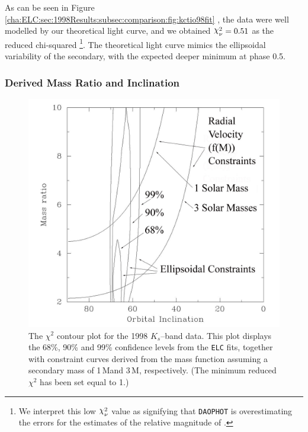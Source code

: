 As can be seen in Figure~%
\vref{cha:ELC:sec:1998Results:subsec:comparison:fig:kctio98fit}%
, the data were well modelled by our theoretical light curve, and we
obtained $\Chi_{\nu}^{2} = 0.51$ as the reduced chi-squared%
\footnote{%
\label{cha:ELC:sec:1998Results:foot:LowError}
We interpret this low $\Chi_{\nu}^{2}$ value as signifying that
\texttt{DAOPHOT} is overestimating the errors for the estimates of the
relative magnitude of \groj. }. %
The theoretical light curve mimics the ellipsoidal variability of the
secondary, with the expected deeper minimum at phase 0.5. %


\subsubsection{Derived Mass Ratio and Inclination}
\label{cha:ELC:sec:1998Results:subsec:comparison:subsubsec:derivedQ}

\begin{figure}[!htb]
\begin{center}
\includegraphics[width=5.0in]{contourPlot2}
\caption{%
The $\chi^2$ contour plot for the 1998 $K_{s}$--band data. This plot displays the 68\%, 90\% and
 99\% confidence levels from the \texttt{ELC} fits, together with constraint curves derived from the mass function assuming a secondary mass of 1\,M\sun and 3\,M\sun, respectively. (The minimum reduced $\chi^2$ has been set equal to 1.) %
}
\label{cha:ELC:sec:1995Results:subsec:comparison:fig:contourPlot2}
\end{center}
\end{figure}

